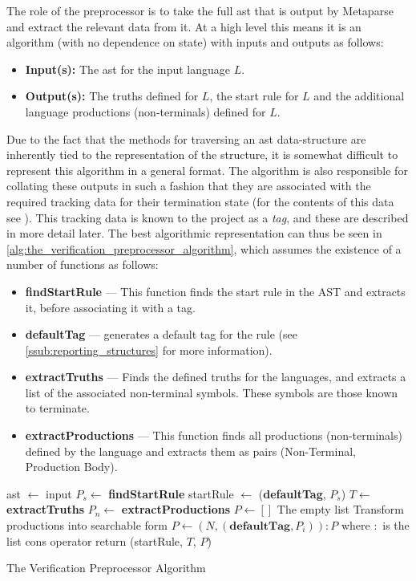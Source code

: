 The role of the preprocessor is to take the full \gls{ast} that is output by Metaparse and extract the relevant data from it. 
At a high level this means it is an algorithm (with no dependence on state) with inputs and outputs as follows:
\begin{itemize}
    \item \textbf{Input(s):} The \gls{ast} for the input language $L$.
    \item \textbf{Output(s):} The truths defined for $L$, the start rule for $L$ and the additional language productions (non-terminals) defined for $L$. 
\end{itemize}

Due to the fact that the methods for traversing an \gls{ast} data-structure are inherently tied to the representation of the structure, it is somewhat difficult to represent this algorithm in a general format.
The algorithm is also responsible for collating these outputs in such a fashion that they are associated with the required tracking data for their termination state (for the contents of this data see ).
This tracking data is known to the project as a \textit{tag}, and these are described in more detail later. 
The best algorithmic representation can thus be seen in \autoref{alg:the_verification_preprocessor_algorithm}, which assumes the existence of a number of functions as follows:
\begin{itemize}
    \item \textbf{findStartRule} --- This function finds the start rule in the AST and extracts it, before associating it with a tag.
    \item \textbf{defaultTag} --- generates a default tag for the rule (see \autoref{ssub:reporting_structures} for more information).
    \item \textbf{extractTruths} --- Finds the defined truths for the languages, and extracts a list of the associated non-terminal symbols.
    These symbols are those known to terminate.
    \item \textbf{extractProductions} --- This function finds all productions (non-terminals) defined by the language and extracts them as pairs (Non-Terminal, Production Body). 
\end{itemize}

\begin{algorithm}[!htb]
\begin{algorithmic}
\State
\State ast $\gets$ input
\State
\State $P_s \gets$ \textbf{findStartRule} 
\State startRule $\gets$ (\textbf{defaultTag}, $P_s$)
\State $T \gets$ \textbf{extractTruths}
\State $P_n \gets$ \textbf{extractProductions}
\State $P \gets []$
\Comment The empty list
\Comment Transform productions into searchable form
    \State $P \gets (N, (\textbf{defaultTag}, P_i)) : P$
    \Comment where $:$ is the list cons operator
\EndFor
\State
\State return (startRule, $T$, $P$)
\end{algorithmic}
\caption{The Verification Preprocessor Algorithm}
\label{alg:the_verification_preprocessor_algorithm}
\end{algorithm}


